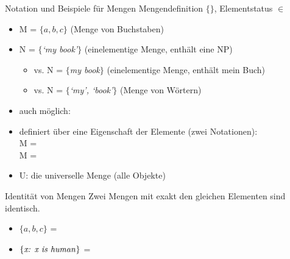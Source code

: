 \begin{frame}
  {Notation und Beispiele für Mengen}
  \onslide<+->
  \onslide<+->
  Mengendefinition \alert{$\{\}$}, Elementstatus $\in$\\
  \Zeile
  \begin{itemize}[<+->]
    \item M = \alert{$\{a,b,c\}$} (Menge von Buchstaben)
      \Halbzeile
    \item N = \alert{$\{$\textit{`my book'}$\}$} (einelementige Menge, enthält eine NP)
      \begin{itemize}[<+->]
        \item vs. \alert{N = $\{$\textit{my book}$\}$} (einelementige Menge, enthält mein Buch)
        \item vs. \alert{N = $\{$\textit{`my', `book'}$\}$} (Menge von Wörtern)
      \end{itemize}
      \Halbzeile
    \item auch möglich: 
      \Halbzeile
    \item definiert über eine Eigenschaft der Elemente (zwei Notationen):\\
      M = \\
      M = 
      \Halbzeile
    \item \alert{U}: die universelle Menge (alle Objekte)
  \end{itemize}
\end{frame}

\begin{frame}
  {Identität von Mengen}
  \onslide<+->
  \onslide<+->
  Zwei Mengen mit exakt den gleichen Elementen sind \alert{identisch}.\\
  \Zeile 
  \begin{itemize}[<+->]
    \item \alert{$\{a,b,c\}$} = 
      \Halbzeile
    \item \alert{$\{\text{\textit{x: x is human}}\}$} = 
  \end{itemize}
\end{frame}

